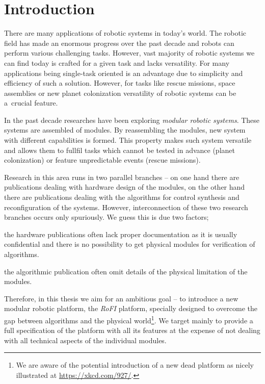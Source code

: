 \chapter{Introduction}\label{chap:introduction}

There are many applications of robotic systems in today's world. The robotic
field has made an enormous progress over the past decade and robots can perform
various challenging tasks. However, vast majority of robotic systems we can find
today is crafted for a given task and lacks versatility. For many applications
being single-task oriented is an advantage due to simplicity and efficiency of
such a solution. However, for tasks like rescue missions, space assemblies or
new planet colonization versatility of robotic systems can be a~crucial feature.

In the past decade researches have been exploring \emph{modular robotic
systems}. These systems are assembled of modules. By reassembling the modules,
new system with different capabilities is formed. This property makes such
system versatile and allows them to fullfil tasks which cannot be tested in
advance (planet colonization) or feature unpredictable events (rescue missions).

Research in this area runs in two parallel branches -- on one hand there are
publications dealing with hardware design of the modules, on the other hand
there are publications dealing with the algorithms for control synthesis and
reconfiguration of the systems. However, interconnection of these two research
branches occurs only spuriously. We guess this is due two factors;
\begin{enumerate*}
    \item the hardware publications often lack proper documentation as it is
    usually confidential and there is no possibility to get physical modules for
    verification of algorithms.
    \item the algorithmic publication often omit details of the physical
    limitation of the modules.
\end{enumerate*}

Therefore, in this thesis we aim for an ambitious goal -- to introduce a new
modular robotic platform, the \emph{RoFI} platform, specially designed to
overcome the gap between algorithms and the physical world\footnote{We are aware
of the potential introduction of a new dead platform as nicely illustrated at
\url{https://xkcd.com/927/}.}. We target mainly to provide a full specification
of the platform with all its features at the expense of not dealing with all
technical aspects of the individual modules.

